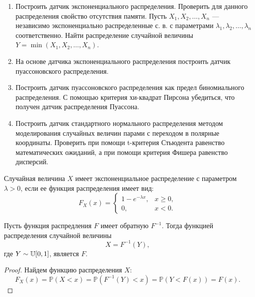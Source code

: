 \begin{enumerate}
	\item Построить датчик экспоненциального распределения. Проверить для
     данного распределения свойство отсутствия памяти. Пусть $X_1, X_2,
     \dots, X_n$ --- независимо экспоненциально распределенные с. в. с
     параметрами $\lambda_1, \lambda_2, \dots, \lambda_n$ соответственно.
     Найти распределение случайной величины $Y = \min(X_1, X_2, \dots, X_n)$.
	\item На основе датчика экспоненциального распределения построить датчик
     пуассоновского распределения.
	\item Построить датчик пуассоновского распределения как предел
     биномиального распределения. С помощью критерия хи-квадрат Пирсона
     убедиться, что получен датчик распределения Пуассона.
	\item Построить датчик стандартного нормального распределения методом
     моделирования случайных величин парами с переходом в полярные координаты.
     Проверить при помощи t-критерия Стьюдента равенство математических
     ожиданий, а при помощи критерия Фишера равенство дисперсий.  
\end{enumerate}

\begin{definition}
	Случайная величина $X$ имеет экспоненциальное распределение с параметром
     $\lambda > 0$, если ее функция распределения имеет вид:
	\begin{equation}\label{exp_func}
	    F_X(x) = 
        \begin{cases}
	        1 - e^{-\lambda x}, &x \geqslant 0,\\
	        0, &x < 0.
	    \end{cases}
	\end{equation}
\end{definition}

\begin{theorem}
    Пусть функция распредления $ F $ имеет обратную $ F^{-1} $. Тогда
     функцией распределения случайной величины
    $$
     X = F^{-1}(Y),
    $$
     где $ Y \sim \operatorname{\mathbb{U}}[0,1]$, является $ F $.
\end{theorem}
\begin{proof}
    Найдем функцию распределения $ X $:
    $$
     F_X(x) = \mathbb{P}(X < x) = \mathbb{P}(F^{-1}(Y) < x) =
      \mathbb{P}(Y < F(x)) = F(x).
    $$
\end{proof}

